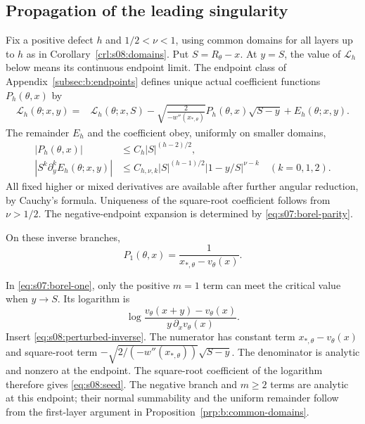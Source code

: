 \subsection{Propagation of the leading singularity}
\label{subsec:s08:02}

Fix a positive defect $h$ and $1/2<\nu<1$, using common domains for
all layers up to $h$ as in Corollary~\ref{crl:s08:domains}.
Put $S=R_\theta-x$. At $y=S$, the value of $\mathcal L_h$ below
means its continuous endpoint limit. The endpoint class of
Appendix~\ref{subsec:b:endpoints} defines unique actual coefficient
functions $P_h(\theta,x)$ by
\begin{equation}\label{eq:s08:leading-expansion}
 \begin{aligned}
 \mathcal L_h(\theta;x,y)
 ={}&\mathcal L_h(\theta;x,S)
 -\sqrt{\frac{2}{-w''(x_{*,\theta})}}
                    P_h(\theta,x)\sqrt{S-y}
 +E_h(\theta;x,y).
 \end{aligned}
\end{equation}
The remainder $E_h$ and the coefficient obey, uniformly on smaller
domains,
\begin{equation}\label{eq:s08:leading-bounds}
 \begin{aligned}
 |P_h(\theta,x)|&\leq C_h|S|^{(h-2)/2},\\
 |S^k\partial_y^k E_h(\theta;x,y)|
 &\leq C_{h,\nu,k}|S|^{(h-1)/2}|1-y/S|^{\nu-k}
                                      \quad(k=0,1,2).
 \end{aligned}
\end{equation}
All fixed higher or mixed derivatives are available after further
angular reduction, by Cauchy's formula. Uniqueness of the
square-root coefficient follows from $\nu>1/2$.
The negative-endpoint expansion is determined by
\eqref{eq:s07:borel-parity}.

\begin{lmm}\label{lmm:s08:seed}
On these inverse branches,
\begin{equation}\label{eq:s08:seed}
 P_1(\theta,x)=\frac1{x_{*,\theta}-v_\theta(x)}.
\end{equation}
\end{lmm}
\begin{prf}
In \eqref{eq:s07:borel-one}, only the positive $m=1$ term can
meet the critical value when $y\to S$. Its logarithm is
\[
 \log\frac{v_\theta(x+y)-v_\theta(x)}
                  {y\,\partial_xv_\theta(x)}.
\]
Insert \eqref{eq:s08:perturbed-inverse}. The numerator has
constant term $x_{*,\theta}-v_\theta(x)$ and square-root term
$-\sqrt{2/(-w''(x_{*,\theta}))}\sqrt{S-y}$.
The denominator is analytic and nonzero at the endpoint.
The square-root coefficient of the logarithm therefore gives
\eqref{eq:s08:seed}. The negative branch and $m\geq2$ terms are
analytic at this endpoint; their normal summability and the uniform
remainder follow from the first-layer argument in
Proposition~\ref{prp:b:common-domains}.
\end{prf}

